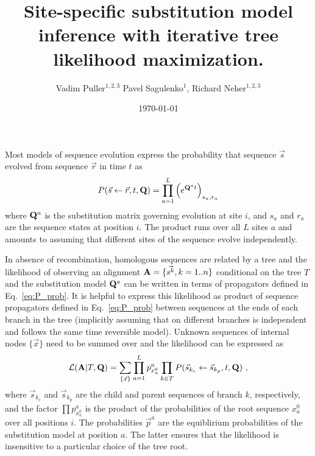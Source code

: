 \documentclass[aps,rmp, onecolumn]{revtex4}
\newcommand{\bq}{\begin{equation}}
\newcommand{\eq}{\end{equation}}
\newcommand{\mat}[1]{{\bf #1}}
\newcommand{\eqp}{p}
\newcommand{\LH}{\mathcal{L}}
\begin{document}
\title{Site-specific substitution model inference with iterative tree likelihood maximization.}
\author{Vadim Puller$^{1,2,3}$ Pavel Sagulenko$^{1}$, Richard Neher$^{1,2,3}$}

\date{\today}

\maketitle

Most models of sequence evolution express the probability that sequence $\vec{s}$ evolved from sequence $\vec{r}$ in time $t$ as
\bq
P(\vec{s}\leftarrow \vec{r},t,\mat{Q}) = \prod_{a=1}^L \left(e^{\mat{Q}^{a} t}\right)_{s_{a},r_{a}}
\label{eq:P_prob}
\eq
where $\mat{Q}^{a}$ is the substitution matrix governing evolution at site $i$, and $s_{a}$ and $r_{a}$ are the sequence states at position $i$.
The product runs over all $L$ sites $a$ and amounts to assuming that different sites of the sequence evolve independently.

In absence of recombination, homologous sequences are related by a tree and the likelihood of observing an alignment $\mat{A}=\{\vec{s^k}, k=1..n\}$ conditional on the tree $T$ and the substitution model $\mat{Q}^{a}$ can be written in terms of propagators defined in Eq.~\ref{eq:P_prob}.
It is helpful to express this likelihood as product of sequence propagators defined in Eq.~\ref{eq:P_prob} between sequences at the ends of each branch in the tree (implicitly assuming that on different branches is independent and follows the same time reversible model).
Unknown sequences of internal nodes $\{\vec{x}\}$ need to be summed over and the likelihood can be expressed as
\begin{equation}
	\LH(\mat{A}|T,\mat{Q}) = \sum_{\{\vec{x}\}}\prod_{a=1}^L \eqp^{a}_{x^{0}_a} \prod_{k\in T}P(\vec{s}_{k_c}\leftarrow \vec{s}_{k_p},t,\mat{Q}) \ ,
	\label{eq:LH}
\end{equation}
where $\vec{s}_{k_c}$ and $\vec{s}_{k_p}$ are the child and parent sequences of branch $k$, respectively, and the factor $\prod \eqp^{a}_{x^{0}_a}$ is the product of the probabilities of the root sequence $x^{0}_a$ over all positions $i$.
The probabilities $\vec{\eqp}^{a}$ are the equiblirium probabilities of the substitution model at position $a$.
The latter ensures that the likelihood is insensitive to a particular choice of the tree root.
\end{document}
